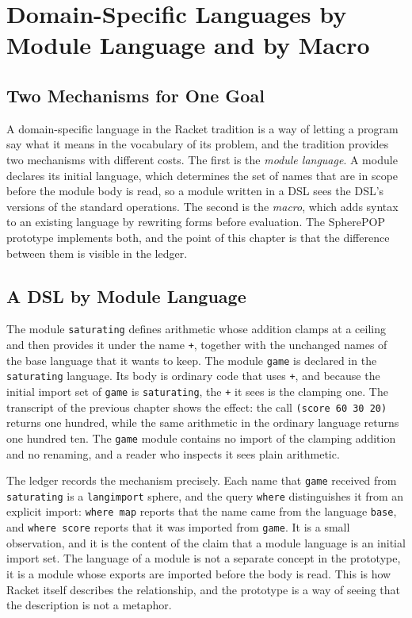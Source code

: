 \documentclass[11pt,oneside]{report}
\newcommand{\SP}{SpherePOP}
\theoremstyle{plain}
\theoremstyle{definition}
\theoremstyle{remark}
\begin{document}
\chapter{Domain-Specific Languages by Module Language and by Macro}

\section{Two Mechanisms for One Goal}

A domain-specific language in the Racket tradition is a way of letting a program say what it means in the vocabulary of its problem, and the tradition provides two mechanisms with different costs. The first is the \emph{module language}. A module declares its initial language, which determines the set of names that are in scope before the module body is read, so a module written in a DSL sees the DSL's versions of the standard operations. The second is the \emph{macro}, which adds syntax to an existing language by rewriting forms before evaluation. The \SP{} prototype implements both, and the point of this chapter is that the difference between them is visible in the ledger.

\section{A DSL by Module Language}

The module \texttt{saturating} defines arithmetic whose addition clamps at a ceiling and then provides it under the name \texttt{+}, together with the unchanged names of the base language that it wants to keep. The module \texttt{game} is declared in the \texttt{saturating} language. Its body is ordinary code that uses \texttt{+}, and because the initial import set of \texttt{game} is \texttt{saturating}, the \texttt{+} it sees is the clamping one. The transcript of the previous chapter shows the effect: the call \texttt{(score 60 30 20)} returns one hundred, while the same arithmetic in the ordinary language returns one hundred ten. The \texttt{game} module contains no import of the clamping addition and no renaming, and a reader who inspects it sees plain arithmetic.

The ledger records the mechanism precisely. Each name that \texttt{game} received from \texttt{saturating} is a \texttt{langimport} sphere, and the query \texttt{where} distinguishes it from an explicit import: \texttt{where map} reports that the name came from the language \texttt{base}, and \texttt{where score} reports that it was imported from \texttt{game}. It is a small observation, and it is the content of the claim that a module language is an initial import set. The language of a module is not a separate concept in the prototype, it is a module whose exports are imported before the body is read. This is how Racket itself describes the relationship, and the prototype is a way of seeing that the description is not a metaphor.
\end{document}
